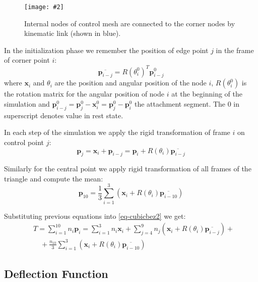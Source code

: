 \documentclass{egpubl}
\newcommand{\Figure}[3]{%
\begin{figure}[htb]
  \centering
  \texttt{[image: \#2]}
  \caption{\label{fig-#2}#3}
\end{figure}}
\begin{document}
\Figure{0.6\linewidth}{segments2}
{Internal nodes of control mesh are connected to the corner nodes by kinematic link (shown in blue).}

In the initialization phase we remember the position of edge point $j$ in the frame of corner point $i$:
%
\begin{equation}
    \overline{\mathbf{p}_{i-j}} = R(\theta_i^0)^T \mathbf{p}_{i-j}^0
\end{equation}
%
where
$\mathbf{x}_i$ and $\theta_i$ are the position and angular position of the node $i$,
$R(\theta_i^0)$ is the rotation matrix for the angular position of node $i$ at the beginning of the simulation and
$\mathbf{p}_{i-j}^0 = \mathbf{p}_j^0 - \mathbf{x}_i^0 = \mathbf{p}_j^0 - \mathbf{p}_i^0$ the attachment segment.
The 0 in superscript denotes value in rest state.

In each step of the simulation we
apply the rigid transformation of frame $i$ on control point $j$:
%
\begin{equation}
    \mathbf{p}_j = \mathbf{x}_i + \mathbf{p}_{i-j} = \mathbf{p}_i + R(\theta_i) \overline{\mathbf{p}_{i-j}}
\end{equation}

Similarly for the central point we apply rigid transformation of all frames of the triangle and compute the mean:
%
\begin{equation}\label{eq-central2}
    \mathbf{p}_{10} =  \frac{1}{3} \sum_{i=1}^3 \left( \mathbf{x}_i + R(\theta_i) \overline{\mathbf{p}_{i-10}} \right)
\end{equation}

Substituting previous equations into \eqref{eq-cubicbez2} we get:
%
\begin{equation}\label{global-transform} \begin{split}
    & T = \sum_{i=1}^{10} n_i \mathbf{p}_i = \sum_{i=1}^{3} n_i \mathbf{x}_i
    + \sum_{j=4}^9 n_j  \left(
    \mathbf{x}_i + R(\theta_i) \overline{\mathbf{p}_{i-j}} \right) + \\
    &\quad + \frac{n_{10}}{3}
    \sum_{i=1}^3 \left( \mathbf{x}_i + R(\theta_i) \overline{\mathbf{p}_{i-10}} \right)
    \end{split}
\end{equation}



\subsection{Deflection Function} %
\end{document}
